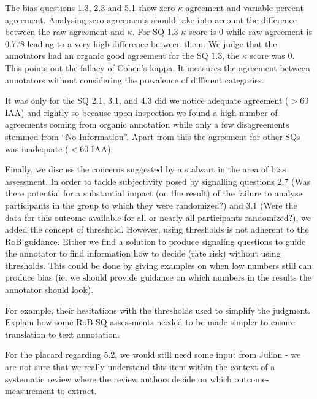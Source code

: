 \documentclass[sn-mathphys,Numbered]{sn-jnl}%
\theoremstyle{thmstyleone}%
\theoremstyle{thmstyletwo}%
\theoremstyle{thmstylethree}%
\begin{document}
The bias questions 1.3, 2.3 and 5.1 show zero $\kappa$ agreement and variable percent agreement.
Analysing zero agreements should take into account the difference between the raw agreement and $\kappa$.
For SQ 1.3 $\kappa$ score is 0 while raw agreement is 0.778 leading to a very high difference between them.
We judge that the annotators had an organic good agreement for the SQ 1.3, the $\kappa$ score was 0.
This points out the fallacy of Cohen's kappa.
It measures the agreement between annotators without considering the prevalence of different categories.


It was only for the SQ 2.1, 3.1, and 4.3 did we notice adequate agreement ($>$60 IAA) and rightly so because upon inspection we found a high number of agreements coming from organic annotation while only a few disagreements stemmed from ``No Information''.
Apart from this the agreement for other SQs was inadequate ($<$60 IAA).



Finally, we discuss the concerns suggested by a stalwart in the area of bias assessment.
In order to tackle subjectivity posed by signalling questions 2.7 (Was there potential for a substantial impact (on the result) of the failure to analyse participants in the group to which they were randomized?) and 3.1 (Were the data for this outcome available for all or nearly all participants randomized?), we added the concept of threshold. However, using thresholds is not adherent to the RoB guidance. Either we find a solution to produce signaling questions to guide the annotator to find information how to decide (rate risk) without using thresholds. This could be done by giving examples on when low numbers still can produce bias (ie. we should provide guidance on which numbers in the results the annotator should look). 

For example, their hesitations with the thresholds used to simplify the judgment.
Explain how some RoB SQ assessments needed to be made simpler to ensure translation to text annotation.

For the placard regarding 5.2, we would still need some input from Julian - we are not sure that we really understand this item within the context of a systematic review where the review authors decide on which outcome-measurement to extract. 
\end{document}
